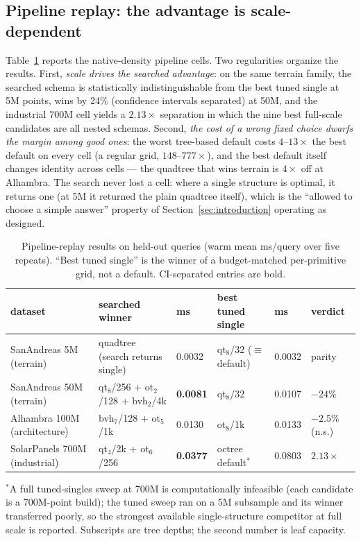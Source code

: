 \subsection{Pipeline replay: the advantage is scale-dependent}
\label{sec:eval-pipeline}

Table~\ref{tab:pipeline} reports the native-density pipeline cells. Two regularities organize the results. First, \emph{scale drives the searched advantage}: on the same terrain family, the searched schema is statistically indistinguishable from the best tuned single at 5M points, wins by 24\% (confidence intervals separated) at 50M, and the industrial 700M cell yields a $2.13\times$ separation in which the nine best full-scale candidates are all nested schemas. Second, \emph{the cost of a wrong fixed choice dwarfs the margin among good ones}: the worst tree-based default costs $4$--$13\times$ the best default on every cell (a regular grid, $148$--$777\times$), and the best default itself changes identity across cells --- the quadtree that wins terrain is $4\times$ off at Alhambra. The search never lost a cell: where a single structure is optimal, it returns one (at 5M it returned the plain quadtree itself), which is the ``allowed to choose a simple answer'' property of Section~\ref{sec:introduction} operating as designed.

\begin{table}[t]
  \centering
  \caption{Pipeline-replay results on held-out queries (warm mean ms/query over five repeats). ``Best tuned single'' is the winner of a budget-matched per-primitive grid, not a default. CI-separated entries are bold.}
  \label{tab:pipeline}
  \small
  \begin{tabular}{llllll}
    \toprule
    dataset & searched winner & ms & best tuned single & ms & verdict \\
    \midrule
    SanAndreas 5M (terrain)       & quadtree (search returns single) & 0.0032 & qt$_{8}$/32 ($\equiv$ default) & 0.0032 & parity \\
    SanAndreas 50M (terrain)      & qt$_{8}$/256 + ot$_{2}$/128 + bvh$_{2}$/4k & \textbf{0.0081} & qt$_{8}$/32 & 0.0107 & \textbf{$-24\%$} \\
    Alhambra 100M (architecture)  & bvh$_{7}$/128 + ot$_{5}$/1k & 0.0130 & ot$_{8}$/1k & 0.0133 & $-2.5\%$ (n.s.) \\
    SolarPanels 700M (industrial) & qt$_{4}$/2k + ot$_{6}$/256 & \textbf{0.0377} & octree default$^{\ast}$ & 0.0803 & \textbf{$2.13\times$} \\
    \bottomrule
  \end{tabular}

  \smallskip
  \raggedright\footnotesize $^{\ast}$A full tuned-singles sweep at 700M is computationally infeasible (each candidate is a 700M-point build); the tuned sweep ran on a 5M subsample and its winner transferred poorly, so the strongest available single-structure competitor at full scale is reported. Subscripts are tree depths; the second number is leaf capacity.
\end{table}

